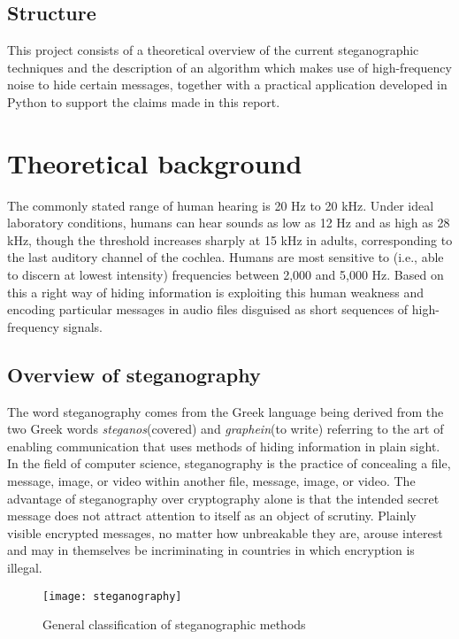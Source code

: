 \documentclass[12pt]{report}
\begin{document}
\section{Structure}
This project consists of a theoretical overview of the current steganographic techniques and the description of an algorithm which makes use of high-frequency noise to hide certain messages, together with a practical application developed in Python to support the claims made in this report. 



\chapter{Theoretical background}

The commonly stated range of human hearing is 20 Hz to 20 kHz. Under ideal laboratory conditions, humans can hear sounds as low as 12 Hz and as high as 28 kHz, though the threshold increases sharply at 15 kHz in adults, corresponding to the last auditory channel of the cochlea. Humans are most sensitive to (i.e., able to discern at lowest intensity) frequencies between 2,000 and 5,000 Hz. Based on this a right way of hiding information is exploiting this human weakness and encoding particular messages in audio files disguised as short sequences of high-frequency signals.




\section{Overview of steganography}
The word steganography comes from the Greek language being derived from the two Greek words \emph{steganos}(covered) and \emph{graphein}(to write) referring to the art of enabling communication that uses methods of hiding information in plain sight. In the field of computer science, steganography is the practice of concealing a file, message, image, or video within another file, message, image, or video.
The advantage of steganography over cryptography alone is that the intended secret message does not attract attention to itself as an object of scrutiny. Plainly visible encrypted messages, no matter how unbreakable they are, arouse interest and may in themselves be incriminating in countries in which encryption is illegal.\cite{note4}

\begin{figure}[!h]
\centering
\texttt{[image: steganography]}
\caption{General classification of steganographic methods}
\label{fig:steganography}
\end{figure}
\end{document}
